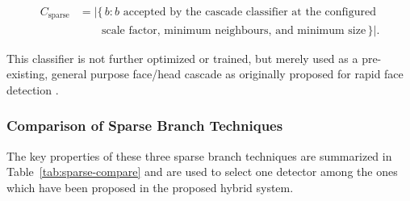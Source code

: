 \begin{equation}
	\begin{aligned}
		C_{\text{sparse}}
		&= \bigl|\{\, b : b \text{ accepted by the cascade classifier at the configured} \\
		&\qquad \text{scale factor, minimum neighbours, and minimum size} \,\}\bigr|.
	\end{aligned}
\end{equation}

This classifier is not further optimized or trained, but merely used as a pre-existing, general purpose face/head cascade as originally proposed for rapid face detection \cite{viola2001rapid}.

\subsubsection{Comparison of Sparse Branch Techniques}
\label{sec:sparse-comparison}

The key properties of these three sparse branch techniques are summarized in Table~\ref{tab:sparse-compare} and are used to select one detector among the ones which have been proposed in the proposed hybrid system.

